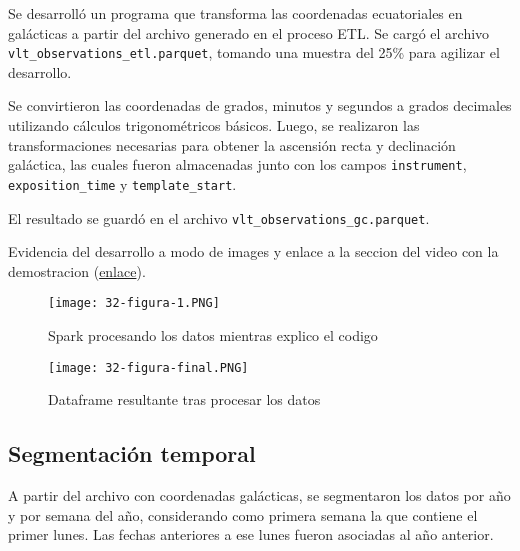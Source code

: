 \documentclass[12pt,letterpaper,twoside]{article}
\begin{document}
Se desarrolló un programa que transforma las coordenadas ecuatoriales en galácticas a partir del archivo generado en el proceso ETL. Se cargó el archivo \texttt{vlt\_observations\_etl.parquet}, tomando una muestra del 25\% para agilizar el desarrollo.

Se convirtieron las coordenadas de grados, minutos y segundos a grados decimales utilizando cálculos trigonométricos básicos. Luego, se realizaron las transformaciones necesarias para obtener la ascensión recta y declinación galáctica, las cuales fueron almacenadas junto con los campos \texttt{instrument}, \texttt{exposition\_time} y \texttt{template\_start}.

El resultado se guardó en el archivo \texttt{vlt\_observations\_gc.parquet}.

Evidencia del desarrollo a modo de images y enlace a la seccion del video con la demostracion ({\color{blue}\href{https://youtu.be/GdrpnyFULTI?si=cb-NDtVoNadNSFb7&t=466}{enlace}}).

\begin{figure}[H]
    \centering
    \texttt{[image: 32-figura-1.PNG]}
    \caption{Spark procesando los datos mientras explico el codigo}
\end{figure}

\begin{figure}[H]
    \centering
    \texttt{[image: 32-figura-final.PNG]}
    \caption{Dataframe resultante tras procesar los datos}
\end{figure}

\newpage
\begin{code}[H]
    
\end{code}
\newpage
\begin{code}[H]
    
\end{code}
\newpage

\subsection{Segmentación temporal}

A partir del archivo con coordenadas galácticas, se segmentaron los datos por año y por semana del año, considerando como primera semana la que contiene el primer lunes. Las fechas anteriores a ese lunes fueron asociadas al año anterior.
\end{document}
